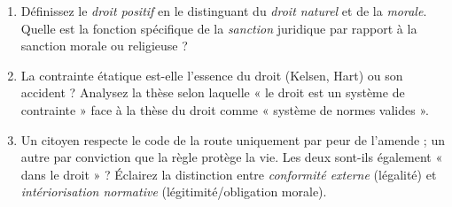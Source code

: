 \documentclass[11pt]{article}
\begin{document}
\begin{exercice}
    \begin{enumerate}
        \item Définissez le \textit{droit positif} en le distinguant du \textit{droit naturel} et de la \textit{morale}. Quelle est la fonction spécifique de la \textit{sanction} juridique par rapport à la sanction morale ou religieuse ?
        \item La contrainte étatique est-elle l'essence du droit (Kelsen, Hart) ou son accident ? Analysez la thèse selon laquelle « le droit est un système de contrainte » face à la thèse du droit comme « système de normes valides ».
        \item Un citoyen respecte le code de la route uniquement par peur de l'amende ; un autre par conviction que la règle protège la vie. Les deux sont-ils également « dans le droit » ? Éclairez la distinction entre \textit{conformité externe} (légalité) et \textit{intériorisation normative} (légitimité/obligation morale).
    \end{enumerate}
\end{exercice}
\end{document}
